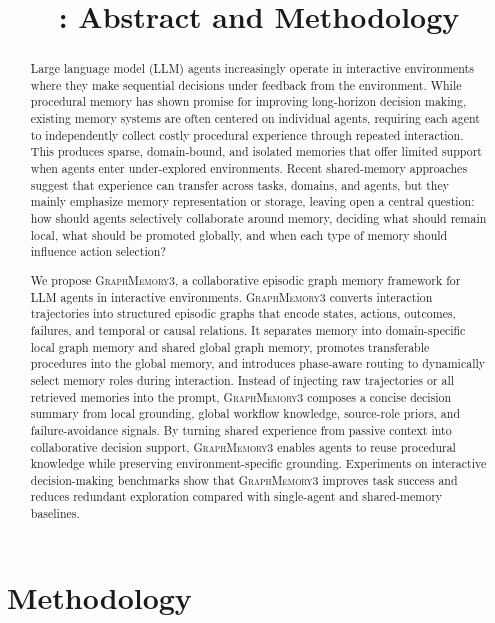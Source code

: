 \documentclass[11pt]{article}
\title{\modelname: Abstract and Methodology}
\author{}
\date{}
\newcommand{\modelname}{\textsc{GraphMemory3}\xspace}
\begin{document}
\maketitle

\begin{abstract}
Large language model (LLM) agents increasingly operate in interactive environments
where they make sequential decisions under feedback from the environment. While
procedural memory has shown promise for improving long-horizon decision making,
existing memory systems are often centered on individual agents, requiring each
agent to independently collect costly procedural experience through repeated
interaction. This produces sparse, domain-bound, and isolated memories that offer
limited support when agents enter under-explored environments. Recent shared-memory
approaches suggest that experience can transfer across tasks, domains, and agents,
but they mainly emphasize memory representation or storage, leaving open a central
question: how should agents selectively collaborate around memory, deciding what
should remain local, what should be promoted globally, and when each type of memory
should influence action selection?

We propose \modelname, a collaborative episodic graph memory framework for LLM
agents in interactive environments. \modelname converts interaction trajectories
into structured episodic graphs that encode states, actions, outcomes, failures,
and temporal or causal relations. It separates memory into domain-specific local
graph memory and shared global graph memory, promotes transferable procedures into
the global memory, and introduces phase-aware routing to dynamically select memory
roles during interaction. Instead of injecting raw trajectories or all retrieved
memories into the prompt, \modelname composes a concise decision summary from local
grounding, global workflow knowledge, source-role priors, and failure-avoidance
signals. By turning shared experience from passive context into collaborative
decision support, \modelname enables agents to reuse procedural knowledge while
preserving environment-specific grounding. Experiments on interactive
decision-making benchmarks show that \modelname improves task success and reduces
redundant exploration compared with single-agent and shared-memory baselines.
\end{abstract}

\section{Methodology}
\end{document}
